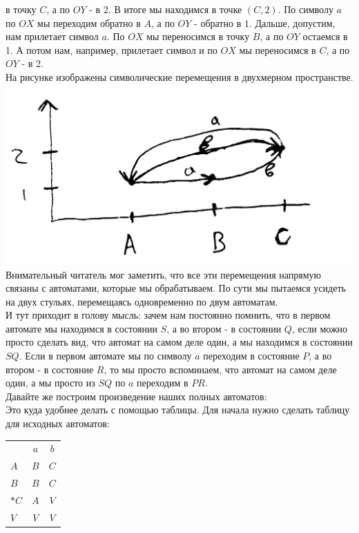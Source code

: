 \documentclass[14pt]{extreport}
\begin{document}
	в точку $C$, а по $OY$ - в 2. В итоге мы находимся в точке $(C, 2)$. По символу $a$ по $OX$
	мы переходим обратно в $A$, а по $OY$ - обратно в $1$. Дальше, допустим, нам прилетает 
	символ $a$. По $OX$ мы переносимся в точку $B$, а по $OY$ остаемся в 1. А потом нам, например,
	прилетает символ и по $OX$ мы переносимся в $C$, а по $OY$ - в 2.\\
	На рисунке изображены символические перемещения в двухмерном пространстве.\\
	\includegraphics[scale=0.14]{data/pic5_6.png}\\
	Внимательный читатель мог заметить, что все эти перемещения напрямую связаны с автоматами,
	которые мы обрабатываем. По сути мы пытаемся усидеть на двух стульях, перемещаясь одновременно
	по двум автоматам.\\
	И тут приходит в голову мысль: зачем нам постоянно помнить, что в первом
	автомате мы находимся в состоянии $S$, а во втором - в состоянии $Q$, если можно просто
	сделать вид, что автомат на самом деле один, а мы находимся в состоянии $SQ$. Если в первом
	автомате мы по символу $a$ переходим в состояние $P$, а во втором - в состояние $R$, то мы
	просто вспоминаем, что автомат на самом деле один, а мы просто из $SQ$ по $a$ переходим в
	$PR$.\\
	Давайте же построим произведение наших полных автоматов:\\
	Это куда удобнее делать с помощью таблицы. Для начала нужно сделать таблицу для исходных
	автоматов:\\
		\begin{tabular}{lcc}
			 & $a$ & $b$ \\
			 $A$ & $B$ & $C$ \\
			 $B$ & $B$ & $C$ \\
			 $*C$ & $A$ & $V$ \\
			 $V$ & $V$ & $V$ \\
		\end{tabular}\hspace*{80pt}
\end{document}
